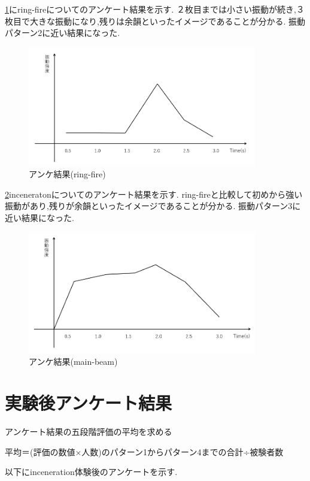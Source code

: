\ref{ringA}にring-fireについてのアンケート結果を示す.
２枚目までは小さい振動が続き,３枚目で大きな振動になり,残りは余韻といったイメージであることが分かる.
振動パターン2に近い結果になった.
\begin{figure}[h]
\centering
\includegraphics[clip,width=10cm]{fig/ringfireAve.png}
\caption{アンケ結果(ring-fire)}\label{ringA}
\end{figure}



\ref{mainA}inceneratonについてのアンケート結果を示す.
ring-fireと比較して初めから強い振動があり,残りが余韻といったイメージであることが分かる.
振動パターン3に近い結果になった.
\begin{figure}[h]
\centering
\includegraphics[clip,width=10cm]{fig/mainbeamAve.png}
\caption{アンケ結果(main-beam)}\label{mainA}
\end{figure}

\newpage

\section{実験後アンケート結果}
アンケート結果の五段階評価の平均を求める

平均＝(評価の数値×人数)のパターン1からパターン4までの合計÷被験者数

以下にinceneration体験後のアンケートを示す.

